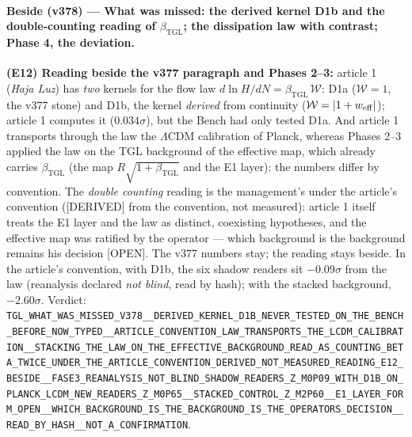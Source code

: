 \documentclass[11pt]{article}
\newcommand{\bTGL}{\beta_{\mathrm{TGL}}}\newcommand{\Msun}{M_{\odot}}\newcommand{\TGL}{\mathrm{TGL}}
\theoremstyle{definition}\newtheorem{deriv}{Derivation}
\begin{document}
\paragraph*{Beside (v378) --- What was missed: the derived kernel D1b and the double-counting reading of $\bTGL$; the dissipation law with contrast; Phase 4, the deviation.} \textbf{(E12) Reading beside the v377 paragraph and Phases 2--3:} article 1 (\emph{Haja Luz}) has \emph{two} kernels for the flow law $d\ln H/dN=\bTGL\,\mathcal W$: D1a ($\mathcal W=1$, the v377 stone) and D1b, the kernel \emph{derived} from continuity ($\mathcal W=|1+w_{\rm eff}|$); article 1 computes it ($0.034\sigma$), but the Bench had only tested D1a. And article 1 transports through the law the $\Lambda$CDM calibration of Planck, whereas Phases 2--3 applied the law on the TGL background of the effective map, which already carries $\bTGL$ (the map $R\sqrt{1+\bTGL}$ and the E1 layer): the numbers differ by convention. The \emph{double counting} reading is the management's under the article's convention (\textsf{[DERIVED]} from the convention, not measured): article 1 itself treats the E1 layer and the law as distinct, coexisting hypotheses, and the effective map was ratified by the operator --- which background is the background remains his decision \textsf{[OPEN]}. The v377 numbers stay; the reading stays beside. In the article's convention, with D1b, the six shadow readers sit $-0.09\sigma$ from the law (reanalysis declared \emph{not blind}, read by hash); with the stacked background, $-2.60\sigma$. Verdict: \texttt{TGL\_WHAT\_WAS\_MISSED\_V378\_\_DERIVED\_KERNEL\_D1B\_NEVER\_TESTED\_ON\_THE\_BENCH\_BEFORE\_NOW\_TYPED\_\_ARTICLE\_CONVENTION\_LAW\_TRANSPORTS\_THE\_LCDM\_CALIBRATION\_\_STACKING\_THE\_LAW\_ON\_THE\_EFFECTIVE\_BACKGROUND\_READ\_AS\_COUNTING\_BETA\_TWICE\_UNDER\_THE\_ARTICLE\_CONVENTION\_DERIVED\_NOT\_MEASURED\_READING\_E12\_BESIDE\_\_FASE3\_REANALYSIS\_NOT\_BLIND\_SHADOW\_READERS\_Z\_M0P09\_WITH\_D1B\_ON\_PLANCK\_LCDM\_NEW\_READERS\_Z\_M0P65\_\_STACKED\_CONTROL\_Z\_M2P60\_\_E1\_LAYER\_FORM\_OPEN\_\_WHICH\_BACKGROUND\_IS\_THE\_BACKGROUND\_IS\_THE\_OPERATORS\_DECISION\_\_READ\_BY\_HASH\_\_NOT\_A\_CONFIRMATION}.
\end{document}

